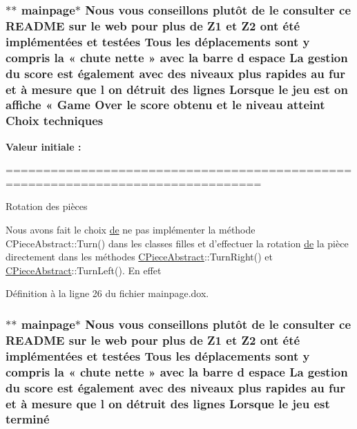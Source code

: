 \hypertarget{mainpage_8dox_a9f12eb7600dd7c128907fcfa304cd3a1}{
\subsubsection[{techniques}]{\setlength{\rightskip}{0pt plus 5cm}$\ast$$\ast$ mainpage$\ast$ Nous vous conseillons plutô{\bf t} {\bf de} le consulter ce R\-E\-A\-D\-M\-E sur le web pour plus {\bf de} {\bf Z1} et Z2 ont é{\bf t}é implémentées et testées Tous les déplacements sont {\bf y} compris la « chute nette » avec la barre d espace La gestion du score est également avec des niveaux plus rapides au fur et à mesure que l on détruit des lignes Lorsque le jeu est on affiche « Game Over le score obtenu et le niveau atteint Choix techniques}}\label{mainpage_8dox_a9f12eb7600dd7c128907fcfa304cd3a1}
{\bfseries Valeur initiale \-:}
\begin{DoxyCode}
================================================================================


                              Rotation des pièces

Nous avons fait le choix \hyperlink{mainpage_8dox_ab37fa35e77d95c6d0d0ab620c97c3db8}{de} ne pas implémenter la méthode CPieceAbstract::Turn()
dans les classes filles et d'effectuer la rotation \hyperlink{mainpage_8dox_ab37fa35e77d95c6d0d0ab620c97c3db8}{de} la pièce directement dans
les méthodes \hyperlink{class_c_piece_abstract}{CPieceAbstract}::TurnRight() et \hyperlink{class_c_piece_abstract}{CPieceAbstract}::TurnLeft(). En
effet
\end{DoxyCode}


Définition à la ligne 26 du fichier mainpage.\-dox.

\hypertarget{mainpage_8dox_a0fd57feadaeea49ac1896789ee89e994}{
\subsubsection[{terminé}]{\setlength{\rightskip}{0pt plus 5cm}$\ast$$\ast$ mainpage$\ast$ Nous vous conseillons plutô{\bf t} {\bf de} le consulter ce R\-E\-A\-D\-M\-E sur le web pour plus {\bf de} {\bf Z1} et Z2 ont é{\bf t}é implémentées et testées Tous les déplacements sont {\bf y} compris la « chute nette » avec la barre d espace La gestion du score est également avec des niveaux plus rapides au fur et à mesure que l on détruit des lignes Lorsque le jeu est terminé}}\label{mainpage_8dox_a0fd57feadaeea49ac1896789ee89e994}


